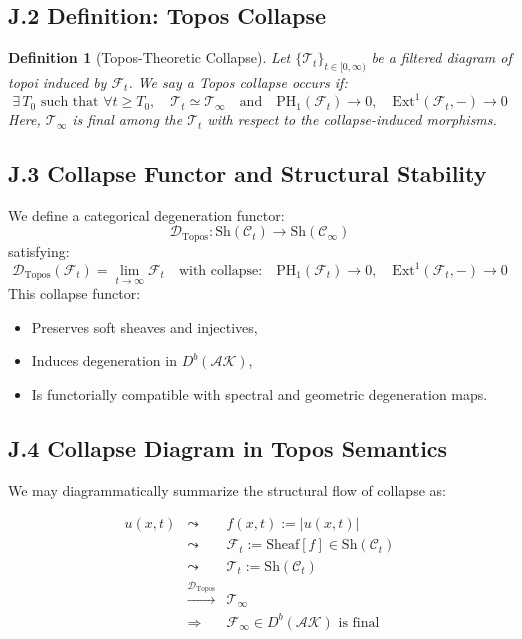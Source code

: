 \documentclass[11pt]{article}
\newtheorem{definition}[theorem]{Definition}
\begin{document}
\subsection*{J.2 Definition: Topos Collapse}

\begin{definition}[Topos-Theoretic Collapse]
Let $\{\mathscr{T}_t\}_{t\in[0,\infty)}$ be a filtered diagram of topoi induced by $\mathcal{F}_t$.  
We say a \emph{Topos collapse} occurs if:
\[
\exists\, T_0 \text{ such that } \forall t \geq T_0,\quad \mathscr{T}_t \simeq \mathscr{T}_\infty
\quad \text{and} \quad \mathrm{PH}_1(\mathcal{F}_t) \to 0,\quad \mathrm{Ext}^1(\mathcal{F}_t, -) \to 0
\]
Here, $\mathscr{T}_\infty$ is final among the $\mathscr{T}_t$ with respect to the collapse-induced morphisms.
\end{definition}

\subsection*{J.3 Collapse Functor and Structural Stability}

We define a categorical degeneration functor:
\[
\mathcal{D}_\mathrm{Topos} : \mathrm{Sh}(\mathcal{C}_t) \longrightarrow \mathrm{Sh}(\mathcal{C}_\infty)
\]
satisfying:
\[
\mathcal{D}_\mathrm{Topos}(\mathcal{F}_t) = \lim_{t \to \infty} \mathcal{F}_t
\quad \text{with collapse:} \quad \mathrm{PH}_1(\mathcal{F}_t) \to 0,\quad \mathrm{Ext}^1(\mathcal{F}_t, -) \to 0
\]
This collapse functor:
\begin{itemize}
  \item Preserves soft sheaves and injectives,
  \item Induces degeneration in $D^b(\mathcal{AK})$,
  \item Is functorially compatible with spectral and geometric degeneration maps.
\end{itemize}

\subsection*{J.4 Collapse Diagram in Topos Semantics}

We may diagrammatically summarize the structural flow of collapse as:

\[
\begin{array}{rcl}
u(x,t) & \leadsto & f(x,t) := |u(x,t)| \\
& \leadsto & \mathcal{F}_t := \mathrm{Sheaf}[f] \in \mathrm{Sh}(\mathcal{C}_t) \\
& \leadsto & \mathscr{T}_t := \mathrm{Sh}(\mathcal{C}_t) \\
& \xrightarrow{\mathcal{D}_\mathrm{Topos}} & \mathscr{T}_\infty \\
& \Longrightarrow & \mathcal{F}_\infty \in D^b(\mathcal{AK}) \text{ is final}
\end{array}
\]
\end{document}

